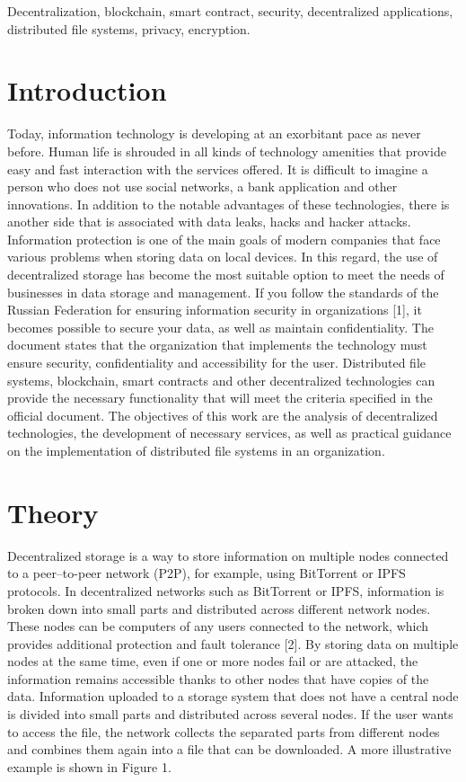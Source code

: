 \documentclass[10pt,conference,a4paper]{IEEEtran_EDM}
\begin{document}
\begin{IEEEkeywords}
Decentralization, blockchain, smart contract, security, decentralized applications, distributed file systems, privacy, encryption.
\end{IEEEkeywords}

\section{Introduction}
Today, information technology is developing at an exorbitant pace as never before. Human life is shrouded in all kinds of technology amenities that provide easy and fast interaction with the services offered. It is difficult to imagine a person who does not use social networks, a bank application and other innovations. In addition to the notable advantages of these technologies, there is another side that is associated with data leaks, hacks and hacker attacks. Information protection is one of the main goals of modern companies that face various problems when storing data on local devices. In this regard, the use of decentralized storage has become the most suitable option to meet the needs of businesses in data storage and management. If you follow the standards of the Russian Federation for ensuring information security in organizations [1], it becomes possible to secure your data, as well as maintain confidentiality. The document states that the organization that implements the technology must ensure security, confidentiality and accessibility for the user. Distributed file systems, blockchain, smart contracts and other decentralized technologies can provide the necessary functionality that will meet the criteria specified in the official document. 
The objectives of this work are the analysis of decentralized technologies, the development of necessary services, as well as practical guidance on the implementation of distributed file systems in an organization.


\section{Theory}

Decentralized storage is a way to store information on multiple nodes connected to a peer–to-peer network (P2P), for example, using BitTorrent or IPFS protocols.
In decentralized networks such as BitTorrent or IPFS, information is broken down into small parts and distributed across different network nodes. These nodes can be computers of any users connected to the network, which provides additional protection and fault tolerance [2]. By storing data on multiple nodes at the same time, even if one or more nodes fail or are attacked, the information remains accessible thanks to other nodes that have copies of the data.
Information uploaded to a storage system that does not have a central node is divided into small parts and distributed across several nodes. If the user wants to access the file, the network collects the separated parts from different nodes and combines them again into a file that can be downloaded. A more illustrative example is shown in Figure 1.
\end{document}
